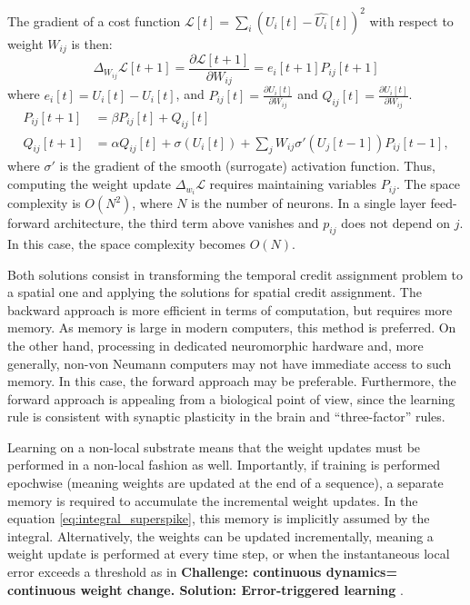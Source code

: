 \documentclass[journal,onecolumn,11pt]{IEEEtran}
\begin{document}
The gradient of a cost function $\mathcal{L}[t] = \sum_i (U_i[t]-\hat{U_i}[t])^2$ with respect to weight $W_{ij}$ is then:
\[
\Delta_{W_{ij}} \mathcal{L}[t+1] = \frac{\partial \mathcal{L}[t+1]}{\partial W_{ij}} = e_i[t+1] P_{ij}[t+1]
\]
where $e_i[t] = U_i[t]-\hat{U_i}[t]$, and $P_{ij}[t] = \frac{\partial U_i[t]} {\partial W_{ij}}$ and $Q_{ij}[t] = \frac{\partial U_i[t]} {\partial W_{ij}}$.
\[
\begin{split}
 P_{ij}[t+1] &= \beta P_{ij}[t] + Q_{ij}[t]\\
 Q_{ij}[t+1] &= \alpha Q_{ij}[t] + \sigma(U_i[t]) + \sum_j W_{ij} \sigma'(U_j[t-1]) P_{ij}[t-1],
\end{split}
\]  
where $\sigma'$ is the gradient of the smooth (surrogate) activation function.
Thus, computing the weight update $\Delta_{w_i} \mathcal{L}$ requires maintaining variables $P_{ij}$. The space complexity is $O(N^2)$, where $N$ is the number of neurons. In a single layer feed-forward architecture, the third term above vanishes and $p_{ij}$ does not depend on $j$. In this case, the space complexity becomes $O(N)$. 

Both solutions consist in transforming the temporal credit assignment problem to a spatial one and applying the solutions for spatial credit assignment. The backward approach is more efficient in terms of computation, but requires more memory. As memory is large in modern computers, this method is preferred. On the other hand, processing in dedicated neuromorphic hardware and, more generally, non-von Neumann computers may not have immediate access to such memory. In this case, the forward approach may be preferable. Furthermore, the forward approach is appealing from a biological point of view, since the learning rule is consistent with synaptic plasticity in the brain and ``three-factor'' rules.

Learning on a non-local substrate means that the weight updates must be performed in a non-local fashion as well. Importantly, if training is performed epochwise (meaning weights are updated at the end of a sequence), a separate memory is required to accumulate the incremental weight updates. In the equation \ref{eq:integral_superspike}, this memory is implicitly assumed by the integral. Alternatively, the weights can be updated incrementally, meaning a weight update is performed at every time step, or when the instantaneous local error exceeds a threshold as in 
\textbf{Challenge: continuous dynamics= continuous weight change. Solution: Error-triggered learning} \cite{Neftci18_datapowe}.
\end{document}

